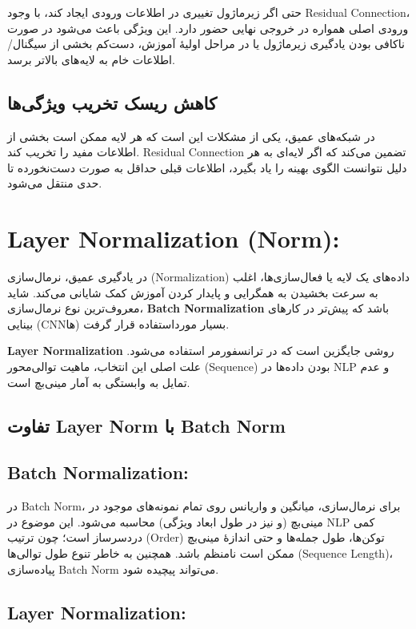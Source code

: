 حتی اگر زیرماژول تغییری در اطلاعات ورودی ایجاد کند، با وجود Residual Connection، ورودی اصلی همواره در خروجی نهایی حضور دارد.
این ویژگی باعث می‌شود در صورت ناکافی بودن یادگیری زیرماژول یا در مراحل اولیهٔ آموزش، دست‌کم بخشی از سیگنال/اطلاعات خام به لایه‌های بالاتر برسد.

\subsection*{کاهش ریسک تخریب ویژگی‌ها}

در شبکه‌های عمیق، یکی از مشکلات این است که هر لایه ممکن است بخشی از اطلاعات مفید را تخریب کند. Residual Connection تضمین می‌کند که اگر لایه‌ای به هر دلیل نتوانست الگوی بهینه را یاد بگیرد، اطلاعات قبلی حداقل به صورت دست‌نخورده تا حدی منتقل می‌شود.

\section{Layer Normalization (Norm):}

در یادگیری عمیق، نرمال‌سازی (Normalization) داده‌های یک لایه یا فعال‌سازی‌ها، اغلب به سرعت بخشیدن به همگرایی و پایدار کردن آموزش کمک شایانی می‌کند. شاید معروف‌ترین نوع نرمال‌سازی، \textbf{Batch Normalization} باشد که پیش‌تر در کارهای بینایی (CNNها) بسیار مورداستفاده قرار گرفت.

\textbf{Layer Normalization} روشی جایگزین است که در ترانسفورمر استفاده می‌شود. علت اصلی این انتخاب، ماهیت توالی‌محور (Sequence) بودن داده‌ها در NLP و عدم تمایل به وابستگی به آمار مینی‌بچ است.



\subsection*{تفاوت Layer Norm با Batch Norm}

\subsection*{Batch Normalization:}

در Batch Norm، برای نرمال‌سازی، میانگین و واریانس روی تمام نمونه‌های موجود در مینی‌بچ (و نیز در طول ابعاد ویژگی) محاسبه می‌شود.
این موضوع در NLP کمی دردسرساز است؛ چون ترتیب (Order) توکن‌ها، طول جمله‌ها و حتی اندازهٔ مینی‌بچ ممکن است نامنظم باشد.
همچنین به خاطر تنوع طول توالی‌ها (Sequence Length)، پیاده‌سازی Batch Norm می‌تواند پیچیده شود.

\subsection*{Layer Normalization:}

